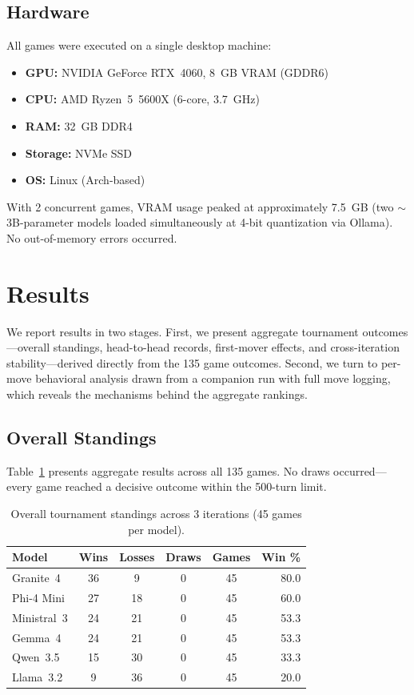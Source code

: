 \documentclass[11pt]{article}
\begin{document}
\subsection{Hardware}

All games were executed on a single desktop machine:
\begin{itemize}[nosep]
\item \textbf{GPU:} NVIDIA GeForce RTX~4060, 8~GB VRAM (GDDR6)
\item \textbf{CPU:} AMD Ryzen~5~5600X (6-core, 3.7~GHz)
\item \textbf{RAM:} 32~GB DDR4
\item \textbf{Storage:} NVMe SSD
\item \textbf{OS:} Linux (Arch-based)
\end{itemize}

With 2 concurrent games, VRAM usage peaked at approximately 7.5~GB (two $\sim$3B-parameter models loaded simultaneously at 4-bit quantization via Ollama). No out-of-memory errors occurred.

\section{Results}
\label{sec:results}

We report results in two stages. First, we present aggregate tournament outcomes---overall standings, head-to-head records, first-mover effects, and cross-iteration stability---derived directly from the 135 game outcomes. Second, we turn to per-move behavioral analysis drawn from a companion run with full move logging, which reveals the mechanisms behind the aggregate rankings.

\subsection{Overall Standings}

Table~\ref{tab:standings} presents aggregate results across all 135 games. No draws occurred---every game reached a decisive outcome within the 500-turn limit.

\begin{table}[H]
\centering
\caption{Overall tournament standings across 3 iterations (45 games per model).}
\label{tab:standings}
\begin{tabular}{lccccr}
\toprule
\textbf{Model} & \textbf{Wins} & \textbf{Losses} & \textbf{Draws} & \textbf{Games} & \textbf{Win \%} \\
\midrule
Granite~4   & 36 &  9 & 0 & 45 & 80.0 \\
Phi-4 Mini  & 27 & 18 & 0 & 45 & 60.0 \\
Ministral~3 & 24 & 21 & 0 & 45 & 53.3 \\
Gemma~4     & 24 & 21 & 0 & 45 & 53.3 \\
Qwen~3.5    & 15 & 30 & 0 & 45 & 33.3 \\
Llama~3.2   &  9 & 36 & 0 & 45 & 20.0 \\
\bottomrule
\end{tabular}
\end{table}
\end{document}
